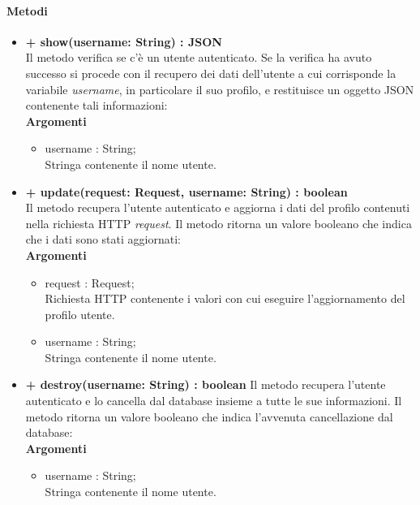 	\paragraph{Metodi}
		\begin{itemize}
			\item \textbf{+ show(username: String) : JSON}\\
			Il metodo verifica se c'è un utente autenticato. Se la verifica ha avuto successo si procede con il recupero dei dati dell'utente a cui corrisponde la variabile \textit{username}, in particolare il suo profilo, e restituisce un oggetto JSON contenente tali informazioni:\\
			\textbf{Argomenti}
			\begin{itemize}
				\item username : String;\\
				Stringa contenente il nome utente.
			\end{itemize}
			
			\newpage
			\item \textbf{+ update(request: Request, username: String) : boolean}\\
			Il metodo recupera l'utente autenticato e aggiorna i dati del profilo contenuti nella richiesta HTTP \textit{request}. Il metodo ritorna un valore booleano che indica che i dati sono stati aggiornati:\\
			\textbf{Argomenti}
			\begin{itemize}
				\item request : Request;\\
				Richiesta HTTP contenente i valori con cui eseguire l'aggiornamento del profilo utente.
				\item username : String;\\
				Stringa contenente il nome utente.
			\end{itemize}
			
			\item \textbf{+ destroy(username: String) : boolean}
			Il metodo recupera l'utente autenticato e lo cancella dal database insieme a tutte le  sue informazioni. Il metodo ritorna un valore booleano che indica l'avvenuta cancellazione dal database:\\
			\textbf{Argomenti}
			\begin{itemize}
				\item username : String;\\
				Stringa contenente il nome utente.
			\end{itemize}
		\end{itemize}
		
